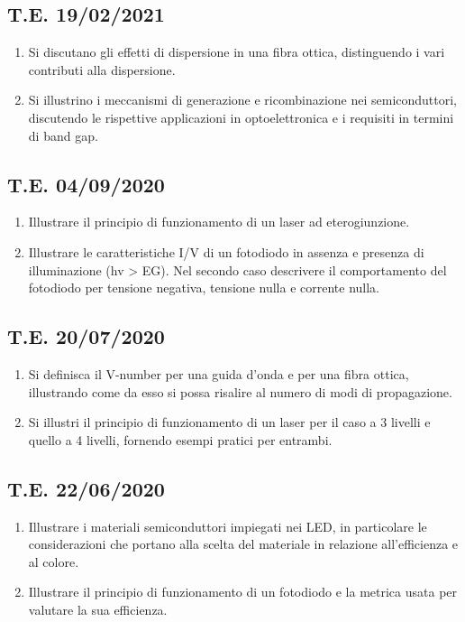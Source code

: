 \documentclass[9pt]{extarticle}
\begin{document}
\subsection{T.E. 19/02/2021}
\begin{enumerate}
  \item Si discutano gli effetti di dispersione in una fibra ottica, distinguendo i vari contributi alla dispersione.
  \item Si illustrino i meccanismi di generazione e ricombinazione nei semiconduttori, discutendo le rispettive applicazioni in optoelettronica e i requisiti in termini di band gap.
\end{enumerate}

\subsection{T.E. 04/09/2020}
\begin{enumerate}
  \item Illustrare il principio di funzionamento di un laser ad eterogiunzione.
  \item Illustrare le caratteristiche I/V di un fotodiodo in assenza e presenza di illuminazione (hv > EG). Nel secondo caso descrivere il comportamento del fotodiodo per tensione negativa, tensione nulla e corrente nulla.
\end{enumerate}

\subsection{T.E. 20/07/2020}
\begin{enumerate}
  \item Si definisca il V-number per una guida d’onda e per una fibra ottica, illustrando come da esso si possa risalire al numero di modi di propagazione.
  \item Si illustri il principio di funzionamento di un laser per il caso a 3 livelli e quello a 4 livelli, fornendo esempi pratici per entrambi.
\end{enumerate}

\subsection{T.E. 22/06/2020}
\begin{enumerate}
  \item Illustrare i materiali semiconduttori impiegati nei LED, in particolare le considerazioni che portano alla scelta del materiale in relazione all'efficienza e al colore.
  \item Illustrare il principio di funzionamento di un fotodiodo e la metrica usata per valutare la sua efficienza.
\end{enumerate}
\end{document}
